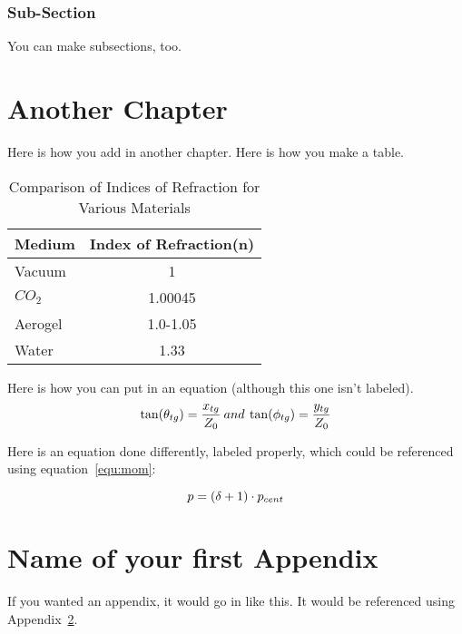 \documentclass[12pt, oneside]{smuthesis}
\begin{document}
\subsection{\sc Sub-Section}

You can make subsections, too.

\newpage

\chapter{Another Chapter}

Here is how you add in another chapter.
Here is how you make a table. \\

\begin{table}
\caption{Comparison of Indices of Refraction for Various Materials}
\label{tab:refindex}
\centering
\begin{tabular}{l|c}
\hline \hline
Medium    & Index of Refraction(n) \\
\hline
Vacuum    & 1                     \\
$CO_{2}$  & 1.00045               \\
Aerogel   & 1.0-1.05              \\
Water     & 1.33                  \\
\hline \hline
\end{tabular}
\end{table}

Here is how you can put in an equation (although this one isn't labeled). \\

\begin{displaymath}
\centering
\tan(\theta_{tg}) = \frac{x_{tg}}{Z_{0}} \: and \:
\tan(\phi_{tg}) = \frac{y_{tg}}{Z_{0}}
\end{displaymath}

Here is an equation done differently, labeled properly, which could be 
referenced using equation~\ref{equ:mom}:

\begin{equation}
\centering
p = (\delta + 1)\cdot p_{cent}
\label{equ:mom}
\end{equation}


\appendix

\chapter{Name of your first Appendix}
\label{app:optics}

If you wanted an appendix, it would go in like this.  It would be 
referenced using Appendix~\ref{app:optics}.


\begin{singlespace}

\end{singlespace}
\end{document}

